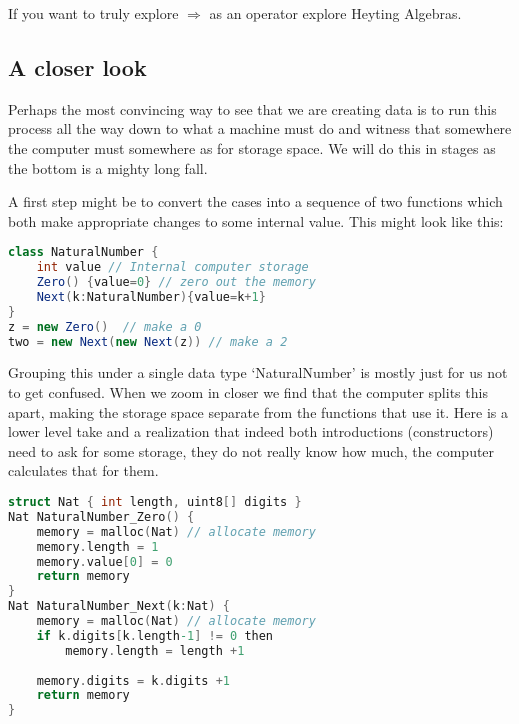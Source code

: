 If you want to truly explore $\Rightarrow$ as an operator explore Heyting Algebras.


\subsection{A closer look}
Perhaps the most convincing way to see that we are creating 
data is to run this process all the way down to what a machine 
must do and witness that somewhere the computer must somewhere 
as for storage space.  We will do this 
in stages as the bottom is a mighty long fall.

A first step might be to convert the cases into a sequence 
of two functions which both make appropriate changes to 
some internal value.  This might look like this:
\begin{center}
\begin{lstlisting}[language=Java]
class NaturalNumber {
    int value // Internal computer storage
    Zero() {value=0} // zero out the memory
    Next(k:NaturalNumber){value=k+1}
}
z = new Zero()  // make a 0
two = new Next(new Next(z)) // make a 2
\end{lstlisting}
\end{center}

Grouping this under a single data type `NaturalNumber'
is mostly just for us not to get confused.  When we 
zoom in closer we find that the computer splits 
this apart, making the storage space separate from the 
functions that use it.  Here is a lower level take
and a realization that indeed both introductions (constructors)
need to ask for some storage, they do not really know 
how much, the computer calculates that for them.
\begin{center}
\begin{lstlisting}[language=C]
struct Nat { int length, uint8[] digits }
Nat NaturalNumber_Zero() { 
    memory = malloc(Nat) // allocate memory
    memory.length = 1
    memory.value[0] = 0
    return memory 
}
Nat NaturalNumber_Next(k:Nat) {
    memory = malloc(Nat) // allocate memory
    if k.digits[k.length-1] != 0 then
        memory.length = length +1
    
    memory.digits = k.digits +1
    return memory 
}
\end{lstlisting}
\end{center}

